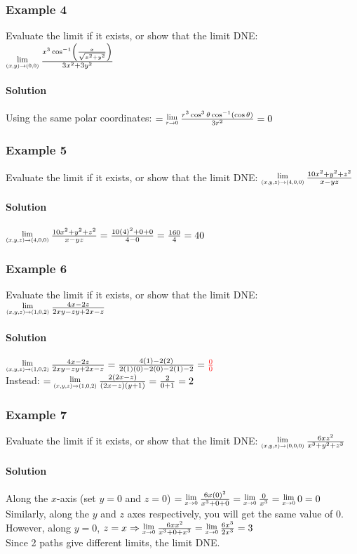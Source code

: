 \documentclass{article}
\newcommand{\Lim}[1]{\raisebox{0.5ex}{\scalebox{0.8}{$\displaystyle \lim_{#1}\;$}}}
\begin{document}
\subsubsection{Example 4}
Evaluate the limit if it exists, or show that the limit DNE: $\Lim{(x,y)\to(0,0)}\frac{x^3\cos^{-1}\left(\frac{x}{\sqrt{x^2+y^2}}\right)}{3x^2+3y^2}$
\paragraph{Solution} Using the same polar coordinates: $=\Lim{r\to0}\frac{r^3\cos^3\theta\cos^{-1}\left(\cos\theta\right)}{3r^2}=0$

\subsubsection{Example 5}
Evaluate the limit if it exists, or show that the limit DNE: $\Lim{(x,y,z)\to(4,0,0)}\frac{10x^2+y^2+z^2}{x-yz}$
\paragraph{Solution} $\Lim{(x,y,z)\to(4,0,0)}\frac{10x^2+y^2+z^2}{x-yz}=\frac{10(4)^2+0+0}{4-0}=\frac{160}{4}=40$

\newpage\subsubsection{Example 6}
Evaluate the limit if it exists, or show that the limit DNE: $\Lim{(x,y,z)\to(1,0,2)}\frac{4x-2z}{2xy-zy+2x-z}$
\paragraph{Solution} $\Lim{(x,y,z)\to(1,0,2)}\frac{4x-2z}{2xy-zy+2x-z}=\frac{4(1)-2(2)}{2(1)(0)-2(0)-2(1)-2}=\textcolor{red}{\frac{0}{0}}$
\\Instead: $=\Lim{(x,y,z)\to(1,0,2)}\frac{2(2x-z)}{(2x-z)(y+1)}=\frac{2}{0+1}=2$

\subsubsection{Example 7}
Evaluate the limit if it exists, or show that the limit DNE: $\Lim{(x,y,z)\to(0,0,0)}\frac{6xz^2}{x^3+y^2+z^3}$
\paragraph{Solution} Along the $x$-axis (set $y=0$ and $z=0$) $=\Lim{x\to0}\frac{6x(0)^2}{x^3+0+0}=\Lim{x\to0}\frac{0}{x^3}=\Lim{x\to0}0=0$
\\Similarly, along the $y$ and $z$ axes respectively, you will get the same value of $0$.
\\However, along $y=0$, $z=x\Rightarrow\Lim{x\to0}\frac{6xx^2}{x^3+0+x^3}=\Lim{x\to0}\frac{6x^3}{2x^3}=3$
\\Since 2 paths give different limits, the limit DNE.
\end{document}
